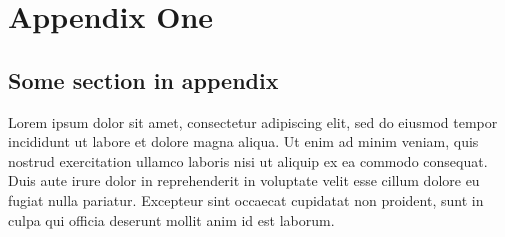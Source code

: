 \documentclass[12pt]{niuthesis}
\begin{document}
\appendix
\chapter{Appendix One}
\section{Some section in appendix}
Lorem ipsum dolor sit amet, consectetur adipiscing elit, sed do eiusmod tempor incididunt ut labore et dolore magna aliqua. Ut enim ad minim veniam, quis nostrud exercitation ullamco laboris nisi ut aliquip ex ea commodo consequat. Duis aute irure dolor in reprehenderit in voluptate velit esse cillum dolore eu fugiat nulla pariatur. Excepteur sint occaecat cupidatat non proident, sunt in culpa qui officia deserunt mollit anim id est laborum.
\end{document}
